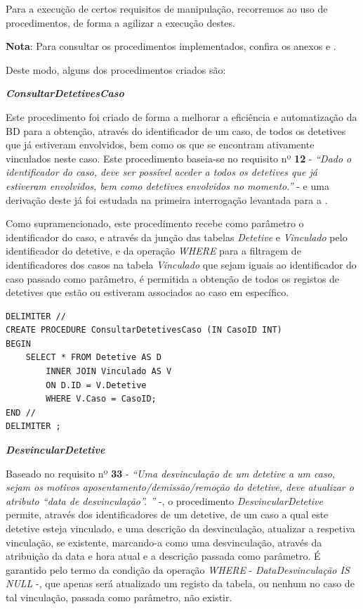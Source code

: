 \documentclass[a4paper,12pt]{scrreprt}
\begin{document}
Para a execução de certos requisitos de manipulação, recorremos ao uso de procedimentos, de forma a agilizar a execução destes.

\textbf{Nota}: Para consultar os procedimentos implementados, confira os anexos \textit{} e \textit{}.

Deste modo, alguns dos procedimentos criados são:

\textit{\textbf{ConsultarDetetivesCaso}}

Este procedimento foi criado de forma a melhorar a eficiência e automatização da BD para a obtenção, através do identificador de um caso, de todos os detetives que já estiveram envolvidos, bem como os que se encontram ativamente vinculados neste caso. Este procedimento baseia-se no requisito nº \textbf{12} -
\textit{“Dado o identificador
do caso, deve ser possível aceder a todos os detetives que já estiveram envolvidos, bem como
detetives envolvidos no momento.”} - e uma derivação deste já foi estudada na primeira interrogação levantada para a \textit{}.

Como supramencionado, este procedimento recebe como parâmetro o identificador do caso, e através da junção das tabelas \textit{Detetive} e \textit{Vinculado} pelo identificador do detetive, e da operação \textit{WHERE} para a filtragem de identificadores dos casos na tabela \textit{Vinculado} que sejam iguais ao identificador do caso passado como parâmetro, é permitida a obtenção de todos os registos de detetives que estão ou estiveram associados ao caso em específico.

\vspace{0.4cm}
\begin{lstlisting}[escapechar=!]
DELIMITER //
CREATE PROCEDURE ConsultarDetetivesCaso (IN CasoID INT)
BEGIN
    SELECT * FROM Detetive AS D
        INNER JOIN Vinculado AS V
        ON D.ID = V.Detetive
        WHERE V.Caso = CasoID;
END //
DELIMITER ;
\end{lstlisting}

\clearpage

\textit{\textbf{DesvincularDetetive}}

Baseado no requisito nº \textbf{33} - \textit{“Uma desvinculação de um detetive a um caso, sejam os motivos aposentamento/demissão/remoção do detetive, deve atualizar o atributo “data de desvinculação”.
”} -, o procedimento \textit{DesvincularDetetive} permite, através dos identificadores de um detetive, de um caso a qual este detetive esteja vinculado, e uma descrição da desvinculação, atualizar a respetiva vinculação, se existente, marcando-a como uma desvinculação, através da atribuição da data e hora atual e a descrição passada como parâmetro. É garantido pelo termo da condição da operação \textit{WHERE} - \textit{DataDesvinculação IS NULL} -, que apenas será atualizado um registo da tabela, ou nenhum no caso de tal vinculação, passada como parâmetro, não existir.
\end{document}
